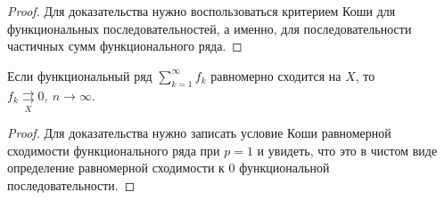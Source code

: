 \documentclass[11pt]{article}
\begin{document}
\begin{proof}
    Для доказательства нужно воспользоваться критерием Коши для функциональных последовательностей, а именно, для последовательности частичных сумм функционального ряда.
\end{proof}

\begin{consequence}
    Если функциональный ряд $\displaystyle \sum_{k = 1}^{\infty} f_k$ равномерно сходится на $X$, то $f_k \underset{X}{\rightrightarrows} 0, \ n \to \infty$.
\end{consequence}

\begin{proof}
    Для доказательства нужно записать условие Коши равномерной сходимости функционального ряда при $p = 1$ и увидеть, что это в чистом виде определение равномерной сходимости к 0
    функциональной последовательности.
\end{proof}
\end{document}
